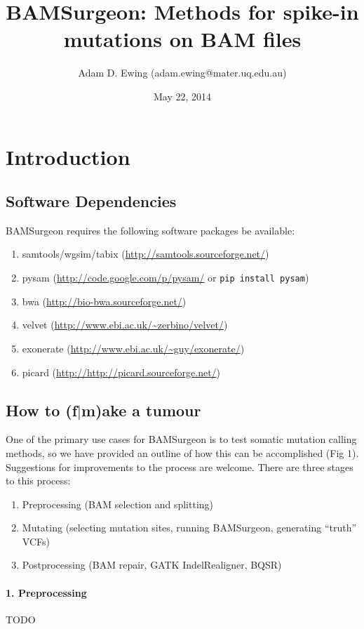 \documentclass[letterpaper,11pt]{article}
\title{BAMSurgeon: Methods for spike-in mutations on BAM files}
\author{Adam D. Ewing (adam.ewing@mater.uq.edu.au)}
\begin{document}
 \date{May 22, 2014}
 \maketitle

\section{Introduction}
\subsection{Software Dependencies}
BAMSurgeon requires the following software packages be available:

\begin{enumerate}
  \item samtools/wgsim/tabix (\url{http://samtools.sourceforge.net/})
  \item pysam (\url{http://code.google.com/p/pysam/} or \texttt{pip install pysam})
  \item bwa (\url{http://bio-bwa.sourceforge.net/})
  \item velvet (\url{http://www.ebi.ac.uk/~zerbino/velvet/})
  \item exonerate (\url{http://www.ebi.ac.uk/~guy/exonerate/})
  \item picard (\url{http://http://picard.sourceforge.net/})
\end{enumerate}

\subsection{How to (f$\vert$m)ake a tumour}
One of the primary use cases for BAMSurgeon is to test somatic mutation calling methods, so we have provided an outline of how this can be accomplished (Fig 1). Suggestions for improvements to the process are welcome. There are three stages to this process:
\begin{enumerate}
\item Preprocessing (BAM selection and splitting)
\item Mutating (selecting mutation sites, running BAMSurgeon, generating ``truth'' VCFs)
\item Postprocessing (BAM repair, GATK IndelRealigner, BQSR)
\end{enumerate}

\paragraph{1. Preprocessing}
TODO
\end{document}
